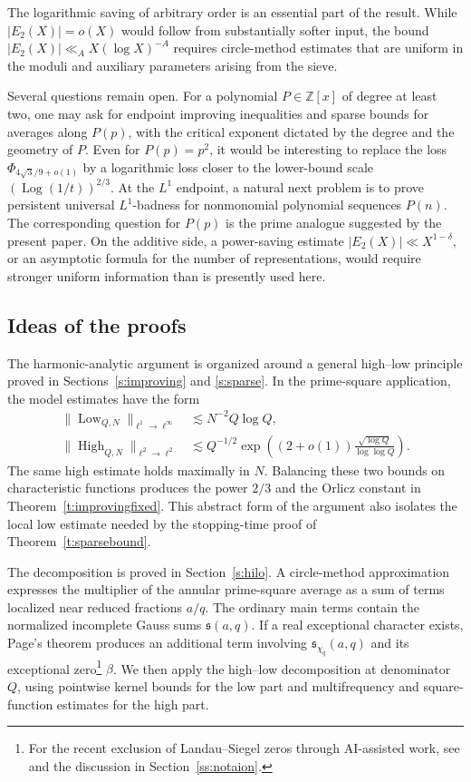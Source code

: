 \documentclass[12pt,reqno]{amsart}
\numberwithin{equation}{section}
\theoremstyle{definition}
\theoremstyle{remark}
\newcommand{\Log}{\operatorname{Log}}
\begin{document}
The logarithmic saving of arbitrary order is an essential part of the
result.  While \(|E_2(X)|=o(X)\) would follow from substantially softer
input, the bound $ |E_2(X)|\ll_A X(\log X)^{-A}$
requires circle-method estimates that are uniform in the moduli and
auxiliary parameters arising from the sieve.

\medskip

Several questions remain open.  For a polynomial \(P\in\mathbb Z[x]\) of
degree at least two, one may ask for endpoint improving inequalities and sparse
bounds for averages along \(P(p)\), with the critical exponent dictated by the
degree and the geometry of \(P\).  Even for \(P(p)=p^2\), it would be
interesting to replace the loss \(\Phi_{4\sqrt3/9+o(1)}\) by a logarithmic
loss closer to the lower-bound scale
\((\Log(1/t))^{2/3}\).
At the \(L^1\) endpoint, a natural next problem is to prove persistent
universal \(L^1\)-badness for nonmonomial polynomial sequences
\(P(n)\).  The corresponding question for \(P(p)\) is the prime
analogue suggested by the present paper. On the
additive side, a power-saving estimate $|E_2(X)|\ll X^{1-\delta},$
or an asymptotic formula for the number of representations, would require
stronger uniform information than is presently used here.

\subsection{Ideas of the proofs}

The harmonic-analytic argument is organized around a general high--low
principle proved in Sections~\ref{s:improving} and \ref{s:sparse}.  In
the prime-square application, the model estimates have the form
\begin{align*}
 \|\operatorname{Low}_{Q,N}\|_{\ell^1\to\ell^\infty}
 &\lesssim N^{-2}Q\log Q,\\
 \|\operatorname{High}_{Q,N}\|_{\ell^2\to\ell^2}
 &\lesssim Q^{-1/2}
 \exp\left((2+o(1))\frac{\sqrt{\log Q}}{\log\log Q}\right).
\end{align*}
The same high estimate holds maximally in $N$.  Balancing these two
bounds on characteristic functions produces the power $2/3$ and the
Orlicz constant in Theorem~\ref{t:improvingfixed}.  This abstract form
of the argument also isolates the local low estimate needed by the
stopping-time proof of Theorem~\ref{t:sparsebound}.

The decomposition is proved in Section~\ref{s:hilo}.  A circle-method
approximation expresses the multiplier of the annular prime-square
average as a sum of terms localized near reduced fractions \(a/q\).
The ordinary main terms contain the normalized incomplete Gauss sums
\(\mathfrak s(a,q)\).  If a real exceptional character exists, Page's
theorem produces an additional term involving
\(\mathfrak s_{\chi_q}(a,q)\) and its exceptional zero\footnote{For the recent exclusion of Landau--Siegel zeros
through AI-assisted work, see
\cite{GreenSiegel2026,TaoSiegel2026} and the discussion in
Section~\ref{ss:notaion}.} \(\beta\).
We then apply the high--low decomposition at denominator \(Q\), using
pointwise kernel bounds for the low part and multifrequency and
square-function estimates for the high part.
\end{document}
